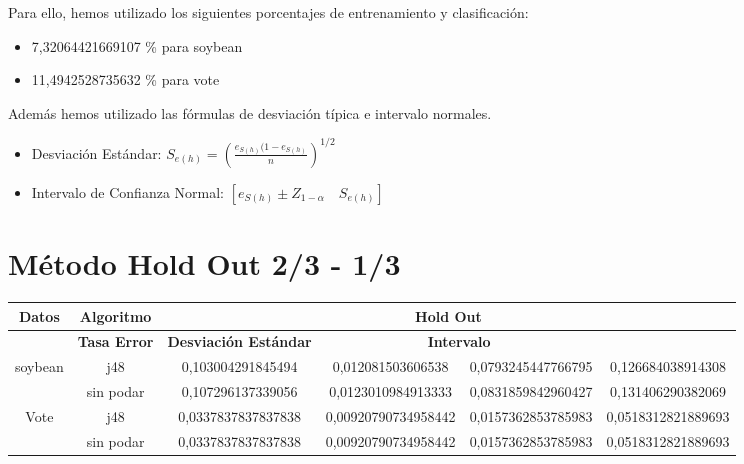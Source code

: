 \documentclass{article}
\begin{document}
Para ello, hemos utilizado los siguientes porcentajes de entrenamiento y clasificación:
\begin{itemize}
	\item 7,32064421669107 \% para soybean
	\item 11,4942528735632 \% para vote
\end{itemize}
\vspace{0.5cm}

Además hemos utilizado las fórmulas de desviación típica e intervalo normales.
\begin{itemize}
	\item Desviación Estándar:	 $S_{e(h)} = (\frac{e_{S(h)}(1-e_{S(h)}}{n})^{1/2}$
	\item Intervalo de Confianza Normal:	$[e_{S(h)}\pm Z_{1-\alpha}\quad S_{e(h)}]$
\end{itemize}

\vspace{1cm}



\section{Método Hold Out 2/3 - 1/3}
\begin{table}[h]
	\begin{adjustbox}{center}
		\begin{tabular}{|c|c|c|c|c|c|}
			\hline
			\rowcolor[gray]{0.8}
			\textbf{Datos} & \textbf{Algoritmo} & \multicolumn{4}{|c|}{\textbf{Hold Out}} \\ \hline
			\rowcolor[gray]{0.8}			
			\multicolumn{2}{|c|}{\textbf{ }} & \textbf{Tasa Error} & \textbf{Desviación Estándar} & 			\multicolumn{2}{|c|}{\textbf{Intervalo}} \\ \hline
			
			soybean & j48 & 0,103004291845494 & 0,012081503606538 & 0,0793245447766795 & 0,126684038914308\\ \hline
			 & sin podar	 & 0,107296137339056 & 0,0123010984913333 & 0,0831859842960427 & 0,131406290382069\\ \hline
			Vote	 & j48 & 0,0337837837837838 & 0,00920790734958442 & 0,0157362853785983 & 0,0518312821889693\\ \hline
			 & sin podar	 & 0,0337837837837838 & 0,00920790734958442 & 0,0157362853785983 & 0,0518312821889693\\ \hline
		\end{tabular}
	\end{adjustbox}
\end{table}
\end{document}
